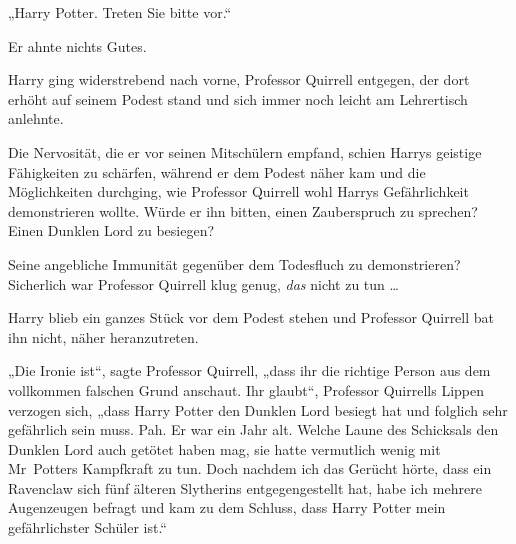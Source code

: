 „Harry Potter. Treten Sie bitte vor.“

Er ahnte nichts Gutes.

Harry ging widerstrebend nach vorne, Professor Quirrell entgegen, der dort erhöht auf seinem Podest stand und sich immer noch leicht am Lehrertisch anlehnte.

Die Nervosität, die er vor seinen Mitschülern empfand, schien Harrys geistige Fähigkeiten zu schärfen, während er dem Podest näher kam und die Möglichkeiten durchging, wie Professor Quirrell wohl Harrys Gefährlichkeit demonstrieren wollte. Würde er ihn bitten, einen Zauberspruch zu sprechen? Einen Dunklen Lord zu besiegen?

Seine angebliche Immunität gegenüber dem Todesfluch zu demonstrieren? Sicherlich war Professor Quirrell klug genug, \emph{das} nicht zu tun …

Harry blieb ein ganzes Stück vor dem Podest stehen und Professor Quirrell bat ihn nicht, näher heranzutreten.

„Die Ironie ist“, sagte Professor Quirrell, „dass ihr die richtige Person aus dem vollkommen falschen Grund anschaut. Ihr glaubt“, Professor Quirrells Lippen verzogen sich, „dass Harry Potter den Dunklen Lord besiegt hat und folglich sehr gefährlich sein muss. Pah. Er war ein Jahr alt. Welche Laune des Schicksals den Dunklen Lord auch getötet haben mag, sie hatte vermutlich wenig mit Mr~Potters Kampfkraft zu tun. Doch nachdem ich das Gerücht hörte, dass ein Ravenclaw sich fünf älteren Slytherins entgegengestellt hat, habe ich mehrere Augenzeugen befragt und kam zu dem Schluss, dass Harry Potter mein gefährlichster Schüler ist.“

